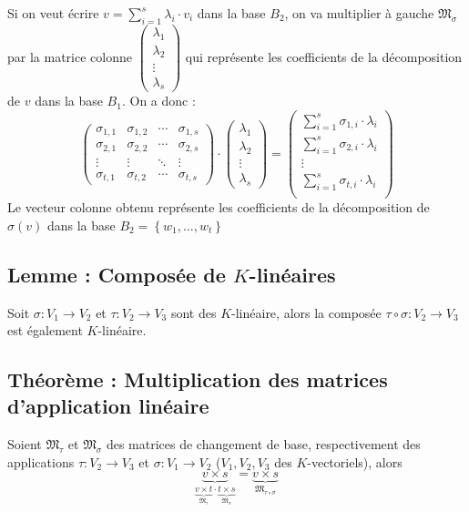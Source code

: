 \documentclass[a4paper,10pt]{article}
\newcommand{\ap}{ \rightarrow} %
\newcommand{\set}[1]{\left\lbrace #1 \right\rbrace } %
\newcommand{\underb}[2]{\underset{ #1 }{\underbrace{ #2 }}} %
\begin{document}
   Si on veut écrire $v=\sum^{s}_{i=1} \lambda_i \cdot v_i$ dans la base $B_2$, on va multiplier à gauche $\mathfrak{M}_\sigma$ par la matrice colonne
   $
   \left(
    \begin{matrix}
     \lambda_1\\
     \lambda_2\\
     \vdots\\
     \lambda_s
    \end{matrix}
   \right)
   $ qui représente les coefficients de la décomposition de $v$ dans la base $B_1$. On a donc :
   $$
    \begin{pmatrix}
     \sigma_{1,1} & \sigma_{1,2} & \cdots & \sigma_{1,s} \\
     \sigma_{2,1} & \sigma_{2,2} & \cdots & \sigma_{2,s} \\
     \vdots       & \vdots       & \ddots & \vdots \\
     \sigma_{t,1} & \sigma_{t,2} & \cdots & \sigma_{t,s}
    \end{pmatrix}
   \cdot
    \begin{pmatrix}
     \lambda_1\\
     \lambda_2\\
     \vdots\\
     \lambda_s
    \end{pmatrix} =
   \begin{pmatrix}
    \displaystyle
    \sum^{s}_{i=1} \sigma_{1,i} \cdot \lambda_i\\
    \displaystyle
    \sum^{s}_{i=1} \sigma_{2,i} \cdot \lambda_i\\
    \vdots\\
    \displaystyle
    \sum^{s}_{i=1} \sigma_{t,i} \cdot \lambda_i\\
   \end{pmatrix}
   $$
   Le vecteur colonne obtenu représente les coefficients de la décomposition de $\sigma(v)$ dans la base $B_2=\set{w_1,\hdots,w_t}$

  \subsection{Lemme : Composée de $K$-linéaires}
   Soit $\sigma : V_1 \ap V_2$ et $\tau : V_2 \ap V_3$ sont des $K$-linéaire, alors la composée $\tau \circ \sigma : V_2 \ap V_3$ est également $K$-linéaire.

  \subsection{Théorème : Multiplication des matrices d'application linéaire}
   Soient $\mathfrak{M}_\tau$ et $\mathfrak{M}_\sigma$ des matrices de changement de base, respectivement des applications $\tau : V_2 \ap V_3$ et $\sigma : V_1 \ap V_2$ ($V_1, V_2, V_3$ des $K$-vectoriels), alors $$\underb{\underb{\mathfrak{M}_\tau}{v \times t} \cdot \underb{\mathfrak{M}_\sigma}{t \times s}}{v \times s} = \underb{\mathfrak{M}_{\tau \circ \sigma}}{v \times s}$$
\end{document}
